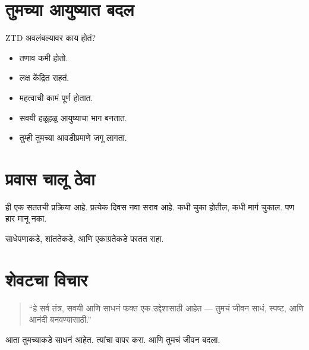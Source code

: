 \section*{तुमच्या आयुष्यात बदल}
ZTD अवलंबल्यावर काय होतं?  
\begin{itemize}
\item तणाव कमी होतो.  
\item लक्ष केंद्रित राहतं.  
\item महत्वाची कामं पूर्ण होतात.  
\item सवयी हळूहळू आयुष्याचा भाग बनतात.  
\item तुम्ही तुमच्या आवडीप्रमाणे जगू लागता.  
\end{itemize}

\section*{प्रवास चालू ठेवा}
ही एक सततची प्रक्रिया आहे.  
प्रत्येक दिवस नवा सराव आहे.  
कधी चुका होतील, कधी मार्ग चुकाल.  
पण हार मानू नका.  

साधेपणाकडे, शांततेकडे,  
आणि एकाग्रतेकडे परतत राहा.  

\section*{शेवटचा विचार}
\begin{quote}
“हे सर्व तंत्र, सवयी आणि साधनं  
फक्त एक उद्देशासाठी आहेत —  
तुमचं जीवन साधं, स्पष्ट, आणि आनंदी बनवण्यासाठी.”  
\end{quote}

आता तुमच्याकडे साधनं आहेत.  
त्यांचा वापर करा.  
आणि तुमचं जीवन बदला.  

